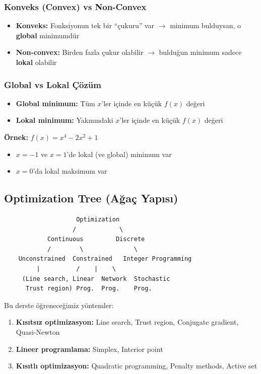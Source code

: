 \documentclass[12pt,a4paper]{article}
\theoremstyle{definition}
\theoremstyle{remark}
\begin{document}
\subsubsection{Konveks (Convex) vs Non-Convex}
\begin{itemize}
    \item \textbf{Konveks:} Fonksiyonun tek bir ``\c{c}ukuru'' var $\to$ minimum bulduysan, o \textbf{global} minimumd\"ur
    \item \textbf{Non-convex:} Birden fazla \c{c}ukur olabilir $\to$ buldu\u{g}un minimum sadece \textbf{lokal} olabilir
\end{itemize}

\subsubsection{Global vs Lokal \c{C}\"oz\"um}
\begin{itemize}
    \item \textbf{Global minimum:} T\"um $x$'ler i\c{c}inde en k\"u\c{c}\"uk $f(x)$ de\u{g}eri
    \item \textbf{Lokal minimum:} Yak{\i}n{\i}ndaki $x$'ler i\c{c}inde en k\"u\c{c}\"uk $f(x)$ de\u{g}eri
\end{itemize}

\textbf{\"Ornek:} $f(x) = x^4 - 2x^2 + 1$
\begin{itemize}
    \item $x = -1$ ve $x = 1$'de lokal (ve global) minimum var
    \item $x = 0$'da lokal maksimum var
\end{itemize}

\subsection{Optimization Tree (A\u{g}a\c{c} Yap{\i}s{\i})}

\begin{verbatim}
                    Optimization
                   /            \
            Continuous         Discrete
            /        \              \
    Unconstrained  Constrained   Integer Programming
         |          /    |    \
     (Line search, Linear  Network  Stochastic
      Trust region) Prog.  Prog.    Prog.
\end{verbatim}

Bu derste \"o\u{g}renece\u{g}imiz y\"ontemler:
\begin{enumerate}
    \item \textbf{K{\i}s{\i}ts{\i}z optimizasyon:} Line search, Trust region, Conjugate gradient, Quasi-Newton
    \item \textbf{Lineer programlama:} Simplex, Interior point
    \item \textbf{K{\i}s{\i}tl{\i} optimizasyon:} Quadratic programming, Penalty methods, Active set
\end{enumerate}
\end{document}
